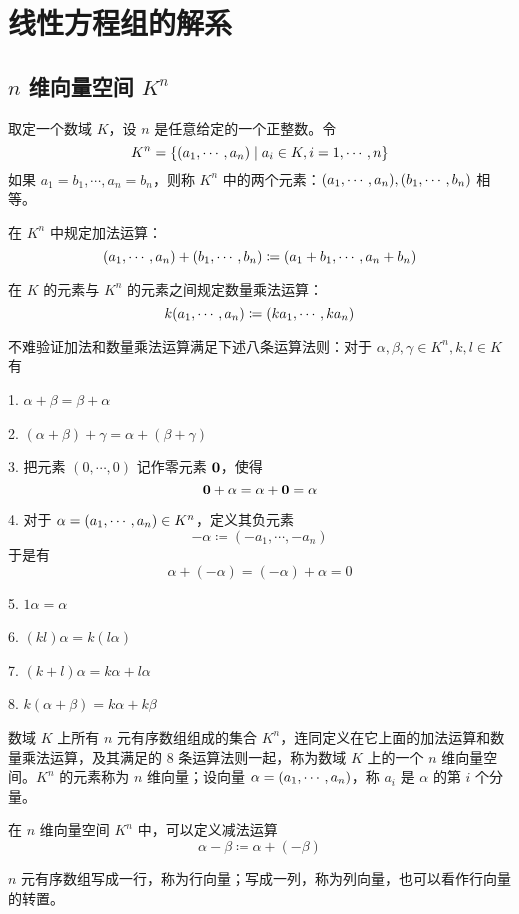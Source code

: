\chapter{线性方程组的解系}

\section{\texorpdfstring{$n$ 维向量空间 $K^n$}{n 维向量空间 Kn}}

取定一个数域 $K$，设 $n$ 是任意给定的一个正整数。令
\[K^n=\{(a_1,\cdots,a_n) \mid a_i\in K,i=1,\cdots,n\}\]
如果 $a_1=b_1,\cdots,a_n=b_n$，则称 $K^n$ 中的两个元素：$(a_1,\cdots,a_n),(b_1,\cdots,b_n)$ 相等。

在 $K^n$ 中规定加法运算：
\[(a_1,\cdots,a_n)+(b_1,\cdots,b_n)\coloneqq (a_1+b_1,\cdots,a_n+b_n)\]

在 $K$ 的元素与 $K^n$ 的元素之间规定数量乘法运算：
\[k(a_1,\cdots,a_n) \coloneqq  (ka_1,\cdots,ka_n)\]

不难验证加法和数量乘法运算满足下述八条运算法则：对于 $\alpha,\beta,\gamma\in K^n,k,l\in K$ 有

1. $\alpha+\beta=\beta+\alpha$

2. $(\alpha+\beta)+\gamma=\alpha+(\beta+\gamma)$

3. 把元素 $(0,\cdots,0)$ 记作零元素 $\boldsymbol{0}$，使得
\[\boldsymbol{0} + \alpha = \alpha + \boldsymbol{0} = \alpha\]

4. 对于 $\alpha = (a_1,\cdots,a_n)\in K^n$，定义其负元素
\[-\alpha \coloneqq  (-a_1,\cdots,-a_n)\]
于是有
\[\alpha + (-\alpha) = (-\alpha)+\alpha = 0\]

5. $1\alpha = \alpha$

6. $(kl)\alpha = k(l\alpha)$

7. $(k+l)\alpha = k\alpha + l\alpha$

8. $k (\alpha+\beta) = k\alpha + k\beta$

\begin{definition}[$n$ 维向量空间]
	数域 $K$ 上所有 $n$ 元有序数组组成的集合 $K^n$，连同定义在它上面的加法运算和数量乘法运算，及其满足的 8 条运算法则一起，称为数域 $K$ 上的一个 $n$ 维向量空间。$K^n$ 的元素称为 $n$ 维向量；设向量 $\alpha  = (a_1,\cdots,a_n)$，称 $a_i$ 是 $\alpha$ 的第 $i$ 个分量。
\end{definition}

在 $n$ 维向量空间 $K^n$ 中，可以定义减法运算
\[\alpha - \beta \coloneqq  \alpha + (-\beta)\]

$n$ 元有序数组写成一行，称为行向量；写成一列，称为列向量，也可以看作行向量的转置。

